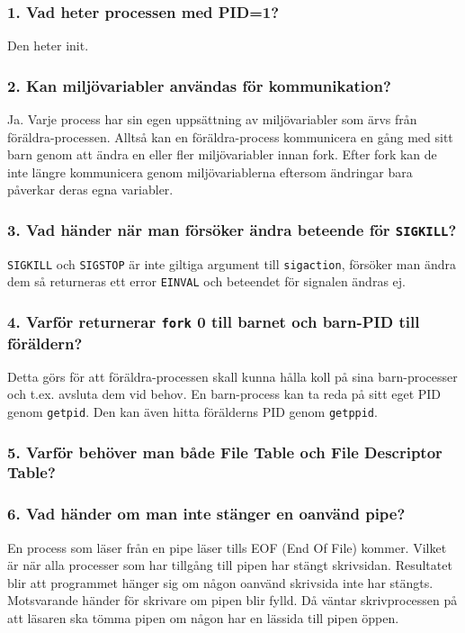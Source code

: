 \documentclass[a4paper]{article}
\begin{document}
\subsubsection*{1. Vad heter processen med PID=1?}
Den heter init.

\subsubsection*{2. Kan miljövariabler användas för kommunikation?}
Ja. Varje process har sin egen uppsättning av miljövariabler som ärvs från föräldra-processen. Alltså kan en föräldra-process kommunicera en gång med sitt barn genom att ändra en eller fler miljövariabler innan fork. Efter fork kan de inte längre kommunicera genom miljövariablerna eftersom ändringar bara påverkar deras egna variabler.

\subsubsection*{3. Vad händer när man försöker ändra beteende för \texttt{SIGKILL}?}
\texttt{SIGKILL} och \texttt{SIGSTOP} är inte giltiga argument till \texttt{sigaction}, försöker man ändra dem så returneras ett error \texttt{EINVAL} och beteendet för signalen ändras ej.

\subsubsection*{4. Varför returnerar \texttt{fork} 0 till barnet och barn-PID till föräldern?}
Detta görs för att föräldra-processen skall kunna hålla koll på sina barn-processer och t.ex. avsluta dem vid behov.
En barn-process kan ta reda på sitt eget PID genom \texttt{getpid}. Den kan även hitta förälderns PID genom \texttt{getppid}.

\subsubsection*{5. Varför behöver man både File Table och File Descriptor Table?}

\subsubsection*{6. Vad händer om man inte stänger en oanvänd pipe?}
En process som läser från en pipe läser tills EOF (End Of File) kommer. Vilket är när alla processer som har tillgång till pipen har stängt skrivsidan. Resultatet blir att programmet hänger sig om någon oanvänd skrivsida inte har stängts. Motsvarande händer för skrivare om pipen blir fylld. Då väntar skrivprocessen på att läsaren ska tömma pipen om någon har en lässida till pipen öppen.
\end{document}
